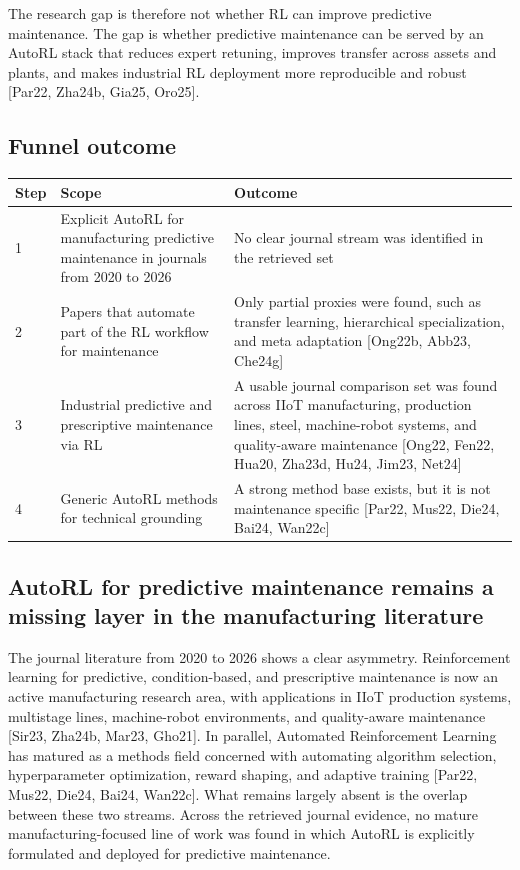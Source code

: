 The research gap is therefore not whether RL can improve predictive maintenance. The gap is whether predictive maintenance can be served by an AutoRL stack that reduces expert retuning, improves transfer across assets and plants, and makes industrial RL deployment more reproducible and robust [Par22, Zha24b, Gia25, Oro25].

\subsection{Funnel outcome}

\begin{table}[htbp]
\centering
\small
\begin{tabular}{p{} p{} p{}}
\hline
Step & Scope & Outcome \\
\hline
1 & Explicit AutoRL for manufacturing predictive maintenance in journals from 2020 to 2026 & No clear journal stream was identified in the retrieved set \\
2 & Papers that automate part of the RL workflow for maintenance & Only partial proxies were found, such as transfer learning, hierarchical specialization, and meta adaptation [Ong22b, Abb23, Che24g] \\
3 & Industrial predictive and prescriptive maintenance via RL & A usable journal comparison set was found across IIoT manufacturing, production lines, steel, machine-robot systems, and quality-aware maintenance [Ong22, Fen22, Hua20, Zha23d, Hu24, Jim23, Net24] \\
4 & Generic AutoRL methods for technical grounding & A strong method base exists, but it is not maintenance specific [Par22, Mus22, Die24, Bai24, Wan22c] \\
\hline
\end{tabular}
\end{table}

\subsection{AutoRL for predictive maintenance remains a missing layer in the manufacturing literature}

The journal literature from 2020 to 2026 shows a clear asymmetry. Reinforcement learning for predictive, condition-based, and prescriptive maintenance is now an active manufacturing research area, with applications in IIoT production systems, multistage lines, machine-robot environments, and quality-aware maintenance [Sir23, Zha24b, Mar23, Gho21]. In parallel, Automated Reinforcement Learning has matured as a methods field concerned with automating algorithm selection, hyperparameter optimization, reward shaping, and adaptive training [Par22, Mus22, Die24, Bai24, Wan22c]. What remains largely absent is the overlap between these two streams. Across the retrieved journal evidence, no mature manufacturing-focused line of work was found in which AutoRL is explicitly formulated and deployed for predictive maintenance.


